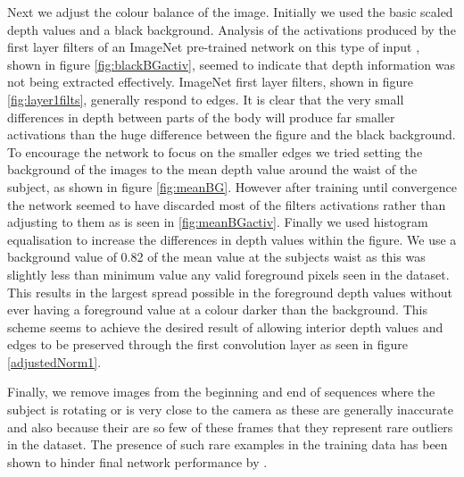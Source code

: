 \documentclass[11pt]{article} %
\begin{document}
Next we adjust the colour balance of the image. Initially we used the basic scaled depth values and a black background. Analysis of the activations produced by the first layer filters of an ImageNet pre-trained network on this type of input , shown in figure \ref{fig:blackBGactiv}, seemed to indicate that depth information was not being extracted effectively. ImageNet first layer filters, shown in figure \ref{fig:layer1filts}, generally respond to edges. It is clear that the very small differences in depth between parts of the body will produce far smaller activations than the huge difference between the figure and the black background. To encourage the network to focus on the smaller edges we tried setting the background of the images to the mean depth value around the waist of the subject, as shown in figure \ref{fig:meanBG}. However after training until convergence the network seemed to have discarded most of the filters activations rather than adjusting to them as is seen in \ref{fig:meanBGactiv}. Finally we used histogram equalisation to increase the differences in depth values within the figure. We use a background value of 0.82 of the mean value at the subjects waist as this was slightly less than minimum value any valid foreground pixels seen in the dataset. This results in the largest spread possible in the foreground depth values without ever having a foreground value at a colour darker than the background. This scheme seems to achieve the desired result of allowing interior depth values and edges to be preserved through the first convolution layer as seen in figure \ref{adjustedNorm1}.

Finally, we remove images from the beginning and end of sequences where the subject is rotating or is very close to the camera as these are generally inaccurate and also because their are so few of these frames that they represent rare outliers in the dataset. The presence of such rare examples in the training data has been shown to hinder final network performance by \cite{Belagiannis}. 
\end{document}
